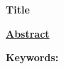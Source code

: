 \documentclass[10pt,a4paper]{report}
\begin{document}
	
\textbf{Title} 

\vspace{1.5cm}

\underline{\textbf{Abstract}}

\vspace{0.3cm}


\vfill

\textbf{Keywords:} 
\end{document}
